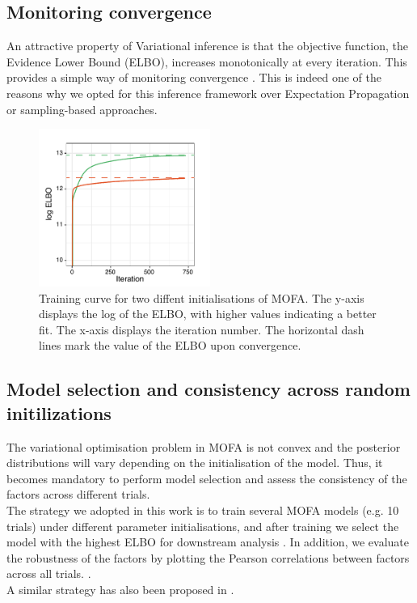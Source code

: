 \subsection{Monitoring convergence}
An attractive property of Variational inference is that the objective function, the Evidence Lower Bound (ELBO), increases monotonically at every iteration. This provides a simple way of monitoring convergence . This is indeed one of the reasons why we opted for this inference framework over Expectation Propagation or sampling-based approaches.

 \begin{figure}[H]
	\centering 	
	\includegraphics[width=0.5\textwidth]{elbo_convergence}
	\caption{Training curve for two diffent initialisations of MOFA. The y-axis displays the log of the ELBO, with higher values indicating a better fit. The x-axis displays the iteration number. The horizontal dash lines mark the value of the ELBO upon convergence. }
	\label{fig:elbo_convergence}
\end{figure}

\subsection{Model selection and consistency across random initilizations} \label{section:robustness}
The variational optimisation problem in MOFA is not convex and the posterior distributions will vary depending on the initialisation of the model. Thus, it becomes mandatory to perform model selection and assess the consistency of the factors across different trials.\\
The strategy we adopted in this work is to train several MOFA models (e.g. 10 trials) under different parameter initialisations, and after training we select the model with the highest ELBO for downstream analysis . In addition, we evaluate the robustness of the factors by plotting the Pearson correlations between factors across all trials. .\\
A similar strategy has also been proposed in \cite{Hore2016,Hore2015-thesis}.


